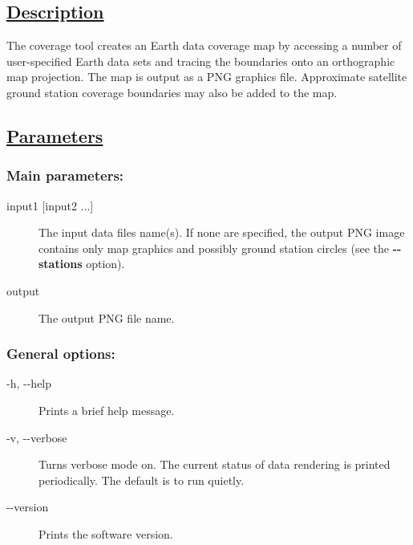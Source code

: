 \subsection*{\underline{Description}}


  The coverage tool creates an Earth data coverage map by accessing a number of user-specified Earth data sets and tracing the boundaries onto an orthographic map projection. The map is output as a PNG graphics file. Approximate satellite ground station coverage boundaries may also be added to the map. 
\subsection*{\underline{Parameters}}
\subsubsection*{Main parameters:}
\begin{description}
\item[input1 [input2 ...{]}]The input data files name(s). If none are specified, the output PNG image contains only map graphics and possibly ground station circles (see the \textbf{-{-}stations}
 option).
\item[output]The output PNG file name.

\end{description}
\subsubsection*{General options:}
\begin{description}
\item[ -h, -{-}help ] Prints a brief help message. 
\item[ -v, -{-}verbose ] Turns verbose mode on. The current status of data rendering is printed periodically. The default is to run quietly. 
\item[-{-}version]Prints the software version.

\end{description}
